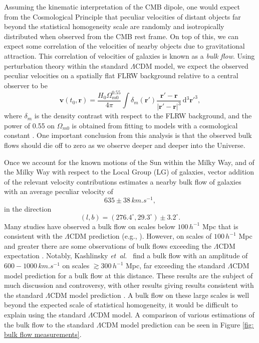 \documentclass[a4paper,12pt]{report}
\newcommand{\diff}[1]{\,\text{d}{#1}}
\renewcommand{\vec}[1]{\ensuremath{\bm{#1}}}
\newcommand{\degree}{^\circ}
\newcommand{\etal}{\emph{et~al.\ }}
\begin{document}
Assuming the kinematic interpretation of the CMB dipole, one would expect from the Cosmological Principle that peculiar velocities of distant objects far beyond the statistical homogeneity scale are randomly and isotropically distributed when observed from the CMB rest frame. On top of this, we can expect some correlation of the velocities of nearby objects due to gravitational attraction. This correlation of velocities of galaxies is known as a \textit{bulk flow}. Using perturbation theory within the standard $\Lambda$CDM model, we expect the observed peculiar velocities on a spatially flat FLRW background relative to a central observer to be \cite{RN118}
\begin{equation}
  \vec{v}(t_0, \vec{r}) = \frac{H_0\Omega_{m0}^{0.55}}{4\pi} \int \delta_m (\vec{r}') \frac{\vec{r}' - \vec{r}}{|\vec{r}' - \vec{r}|^3}\diff{^3 \vec{r'}^3},
\end{equation}
where $\delta_m$ is the density contrast with respect to the FLRW background, and the power of 0.55 on $\Omega_{m0}$ is obtained from fitting to models with a cosmological constant \cite{RN166}. One important conclusion from this analysis is that the observed bulk flows should die off to zero as we observe deeper and deeper into the Universe.

Once we account for the known motions of the Sun within the Milky Way, and of the Milky Way with respect to the Local Group (LG) of galaxies, vector addition of the relevant velocity contributions estimates a nearby bulk flow of galaxies with an average peculiar velocity of \cite{RN74}
\begin{equation}
  635 \pm 38\, \si{km.s^{-1}},
\end{equation}
in the direction
\begin{equation}
  (l,b) = (276.4\degree, 29.3\degree) \pm 3.2\degree.
\end{equation}
Many studies have observed a bulk flow on scales below $100\, h^{-1}$ Mpc that is consistent with the $\Lambda$CDM prediction (e.g., \cite{RN181,RN185,RN117}). However, on scales of $100\, h^{-1}$ Mpc and greater there are some observations of bulk flows exceeding the $\Lambda$CDM expectation \cite{RN82,RN183,RN78,RN186,RN192}.
Notably, Kashlinsky \etal \cite{RN78} find a bulk flow with an amplitude of $600-1000\, \si{km.s^{-1}}$ on scales $\gtrsim 300\, h^{-1}$ Mpc, far exceeding the standard $\Lambda$CDM model prediction for a bulk flow at this distance.
These results are the subject of much discussion and controversy, with other results giving results consistent with the standard $\Lambda$CDM model prediction \cite{RN181,RN182,RN187,RN188,RN189,RN77}.
A bulk flow on these large scales is well beyond the expected scale of statistical homogeneity, it would be difficult to explain using the standard $\Lambda$CDM model. A comparison of various estimations of the bulk flow to the standard $\Lambda$CDM model prediction can be seen in Figure \ref{fig: bulk flow measurements}.
\end{document}

